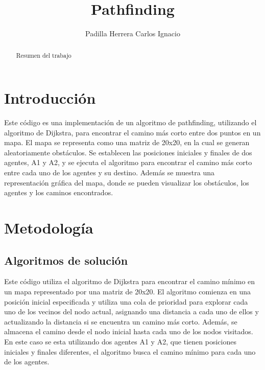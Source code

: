 \documentclass[12pt,a4paper]{article}
\title{Pathfinding}
\author{Padilla Herrera Carlos Ignacio}
\date{}
\begin{document}
\maketitle

\begin{abstract}
Resumen del trabajo
\end{abstract}

\section{Introducción}
Este código es una implementación de un algoritmo de pathfinding, utilizando el
algoritmo de Dijkstra, para encontrar el camino más corto entre dos puntos en un
mapa. El mapa se representa como una matriz de 20x20, en la cual se generan aleatoriamente
obstáculos. Se establecen las posiciones iniciales y finales de dos agentes, A1 y A2, y se ejecuta
el algoritmo para encontrar el camino más corto entre cada uno de los agentes y su destino. Además
se muestra una representación gráfica del mapa, donde se pueden visualizar los obstáculos, los agentes
y los caminos encontrados.

\section{Metodología}
\subsection{Algoritmos de solución}
Este código utiliza el algoritmo de Dijkstra para encontrar el camino mínimo en un mapa
representado por una matriz de 20x20. El algoritmo comienza en una posición inicial especificada y
utiliza una cola de prioridad para explorar cada uno de los vecinos del nodo actual, asignando una
distancia a cada uno de ellos y actualizando la distancia si se encuentra un camino más corto.
Además, se almacena el camino desde el nodo inicial hasta cada uno de los nodos visitados. En este
caso se esta utilizando dos agentes A1 y A2, que tienen posiciones iniciales y finales diferentes,
el algoritmo busca el camino mínimo para cada uno de los agentes.
\end{document}
